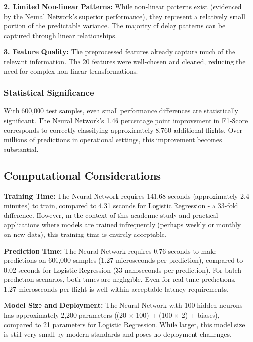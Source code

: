 \documentclass[sigconf]{acmart}
\begin{document}
\textbf{2. Limited Non-linear Patterns:} While non-linear patterns exist (evidenced by the Neural Network's superior performance), they represent a relatively small portion of the predictable variance. The majority of delay patterns can be captured through linear relationships.

\textbf{3. Feature Quality:} The preprocessed features already capture much of the relevant information. The 20 features were well-chosen and cleaned, reducing the need for complex non-linear transformations.

\subsubsection{Statistical Significance}

With 600,000 test samples, even small performance differences are statistically significant. The Neural Network's 1.46 percentage point improvement in F1-Score corresponds to correctly classifying approximately 8,760 additional flights. Over millions of predictions in operational settings, this improvement becomes substantial.

\subsection{Computational Considerations}

\textbf{Training Time:} The Neural Network requires 141.68 seconds (approximately 2.4 minutes) to train, compared to 4.31 seconds for Logistic Regression - a 33-fold difference. However, in the context of this academic study and practical applications where models are trained infrequently (perhaps weekly or monthly on new data), this training time is entirely acceptable.

\textbf{Prediction Time:} The Neural Network requires 0.76 seconds to make predictions on 600,000 samples (1.27 microseconds per prediction), compared to 0.02 seconds for Logistic Regression (33 nanoseconds per prediction). For batch prediction scenarios, both times are negligible. Even for real-time predictions, 1.27 microseconds per flight is well within acceptable latency requirements.

\textbf{Model Size and Deployment:} The Neural Network with 100 hidden neurons has approximately 2,200 parameters ((20 × 100) + (100 × 2) + biases), compared to 21 parameters for Logistic Regression. While larger, this model size is still very small by modern standards and poses no deployment challenges.
\end{document}
